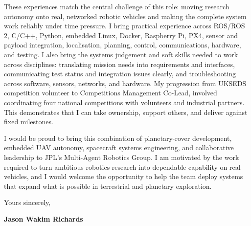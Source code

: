\documentclass[10pt,a4paper]{article}
\newcommand{\BodySize}{9.25pt}
\newcommand{\BodyLineSize}{12.1pt}
\newcommand{\ParagraphSpacing}{10pt}       %
\newcommand{\ClosingBefore}{7pt}          %
\newcommand{\SignatureSpace}{22pt}         %
\newcommand{\LetterParagraph}[1]{%
    \noindent #1\par
    \addvspace{\ParagraphSpacing}%
}
\newcommand{\LetterFinalParagraph}[1]{%
    \noindent #1\par
}
\begin{document}
{    \LetterParagraph{%
        These experiences match the central challenge of this role: moving research
        autonomy onto real, networked robotic vehicles and making the complete system
        work reliably under time pressure. I bring practical experience across
        ROS/ROS 2, C/C++, Python, embedded Linux, Docker, Raspberry Pi, PX4, sensor and
        payload integration, localisation, planning, control, communications, hardware,
        and testing. I also bring the systems judgement and soft skills needed to work
        across disciplines: translating mission needs into requirements and interfaces,
        communicating test status and integration issues clearly, and troubleshooting
        across software, sensors, networks, and hardware. My progression from UKSEDS
        competition volunteer to Competitions Management Co-Lead, involved coordinating four
        national competitions with volunteers and industrial partners. This demonstrates
        that I can take ownership, support others, and deliver against fixed milestones.%
    }

    \LetterFinalParagraph{%
        I would be proud to bring this combination of planetary-rover development,
        embedded UAV autonomy, spacecraft systems engineering, and collaborative
        leadership to JPL's Multi-Agent Robotics Group. I am motivated by the work
        required to turn ambitious robotics research into dependable capability on real
        vehicles, and I would welcome the opportunity to help the team deploy systems
        that expand what is possible in terrestrial and planetary exploration.%
    }
}


\vspace{\ClosingBefore}

{\fontsize{\BodySize}{\BodyLineSize}\selectfont
    \textcolor{CVDarkGray}{Yours sincerely,}}

\vspace{\SignatureSpace}

{\fontsize{\BodySize}{\BodyLineSize}\selectfont
    \textbf{\textcolor{CVBlack}{Jason Wakim Richards}}}
\end{document}
